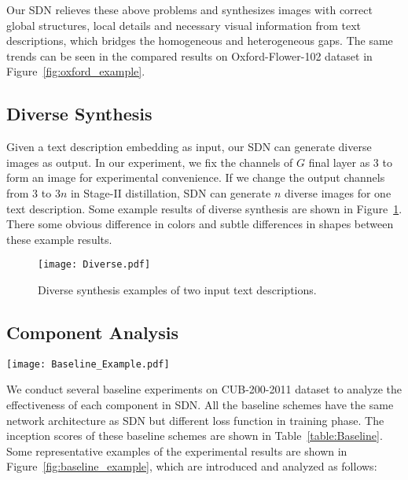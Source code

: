 \documentclass[sigconf]{acmart}
\begin{document}
Our SDN relieves these above problems and synthesizes images with correct global structures, local details and necessary visual information from text descriptions, which bridges the homogeneous and heterogeneous gaps. The same trends can be seen in the compared results on Oxford-Flower-102 dataset in Figure~\ref{fig:oxford_example}. 

\subsection{Diverse Synthesis}
Given a text description embedding as input, our SDN can generate diverse images as output. In our experiment, we fix the channels of $G$ final layer as $3$ to form an image for experimental convenience. If we change the output channels from $3$ to $3n$ in Stage-II distillation, SDN can generate $n$ diverse images for one text description. Some example results of diverse synthesis are shown in Figure~\ref{fig:diverse}. There some obvious difference in colors and subtle differences in shapes between these example results.

\begin{figure}[!htb]
	\begin{center}
		\texttt{[image: Diverse.pdf]}
	\end{center}
	\caption{Diverse synthesis examples of two input text descriptions.}
	\label{fig:diverse}
\end{figure} 

\subsection{Component Analysis}

\begin{figure*}
	\begin{center}
		\texttt{[image: Baseline\_Example.pdf]}
	\end{center}
	\caption{Example results by our proposed SDN and the baselines on the CUB-200-2011 testing set.}
	\label{fig:baseline_example}
\end{figure*}

We conduct several baseline experiments on CUB-200-2011 dataset to analyze the effectiveness of each component in SDN. All the baseline schemes have the same network architecture as SDN but different loss function in training phase. The inception scores of these baseline schemes are shown in Table~\ref{table:Baseline}. Some representative examples of the experimental results are shown in Figure~\ref{fig:baseline_example}, which are introduced and analyzed as follows:
\end{document}
